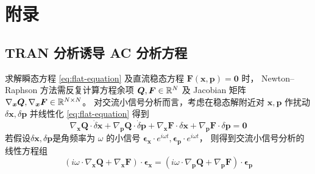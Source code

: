 \section*{附录}
\renewcommand\thesubsection{\Alph{subsection}}
\subsection{TRAN 分析诱导 AC 分析方程}\label{appendix:TRAN-to-AC-equation}
求解瞬态方程 \ref{eq:flat-equation} 及直流稳态方程 $\bm{F}(\bm{x},\bm{p})=\bm{0}$ 时，
Newton–Raphson 方法需反复计算方程余项 $\bm{Q},\bm{F}\in\mathbb{R}^N$ 及 Jacobian 矩阵
$\nabla_{\bm{x}}\bm{Q},\nabla_{\bm{x}}\bm{F}\in\mathbb{R}^{N\times N}$。
对交流小信号分析而言，考虑在稳态解附近对 $\bm{x},\bm{p}$ 作扰动
$\delta\bm{x},\delta\bm{p}$ 并线性化 \ref{eq:flat-equation} 得到
\[
  \nabla_{\bm{x}}\bm{Q}\cdot\dot{\delta}\bm{x}
  +\nabla_{\bm{p}}\bm{Q}\cdot\dot{\delta}\bm{p}
  +\nabla_{\bm{x}}\bm{F}\cdot\delta\bm{x}
  +\nabla_{\bm{p}}\bm{F}\cdot\delta\bm{p}=\bm{0}
\]
若假设$\delta\bm{x},\delta\bm{p}$是角频率为 $\omega$ 的小信号
$\bm{\epsilon}_{\bm{x}}\cdot e^{i\omega t},\bm{\epsilon}_{\bm{p}}\cdot e^{i\omega t}$，
则得到交流小信号分析的线性方程组
\begin{equation}\label{eq:flat-ac-equation}
  (i\omega\cdot\nabla_{\bm{x}}\bm{Q}+\nabla_{\bm{x}}\bm{F})\cdot\bm{\epsilon}_{\bm{x}}
  = (i\omega\cdot\nabla_{\bm{p}}\bm{Q}+\nabla_{\bm{p}}\bm{F})\cdot\bm{\epsilon}_{\bm{p}}
\end{equation}


